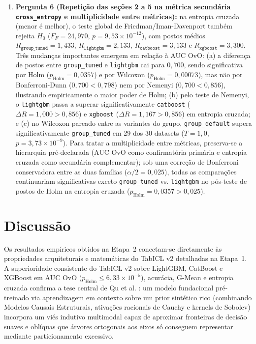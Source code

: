 \documentclass[11pt,a4paper]{article}
\begin{document}
\begin{enumerate}[leftmargin=2em]
    \item \textbf{Pergunta 6 (Repetição das seções 2 a 5 na métrica secundária \texttt{cross\_entropy} e multiplicidade entre métricas):} na entropia cruzada (menor é melhor), o teste global de Friedman/Iman-Davenport também rejeita $H_0$ ($F_F = 24{,}970$, $p = 9{,}53 \times 10^{-12}$), com postos médios $R_{\texttt{group\_tuned}} = 1{,}433$, $R_{\texttt{lightgbm}} = 2{,}133$, $R_{\texttt{catboost}} = 3{,}133$ e $R_{\texttt{xgboost}} = 3{,}300$. Três mudanças importantes emergem em relação à AUC OvO: (a) a diferença de postos entre \texttt{group\_tuned} e \texttt{lightgbm} cai para $0{,}700$, sendo significativa por Holm ($p_{\text{Holm}} = 0{,}0357$) e por Wilcoxon ($p_{\text{Holm}} = 0{,}00073$), mas não por Bonferroni-Dunn ($0{,}700 < 0{,}798$) nem por Nemenyi ($0{,}700 < 0{,}856$), ilustrando empiricamente o maior poder de Holm; (b) pelo teste de Nemenyi, o \texttt{lightgbm} passa a superar significativamente \texttt{catboost} ($\Delta R = 1{,}000 > 0{,}856$) e \texttt{xgboost} ($\Delta R = 1{,}167 > 0{,}856$) em entropia cruzada; e (c) no Wilcoxon pareado entre as variantes do grupo, \texttt{group\_default} supera significativamente \texttt{group\_tuned} em 29 dos 30 datasets ($T = 1{,}0$, $p = 3{,}73 \times 10^{-9}$). Para tratar a multiplicidade entre métricas, preserva-se a hierarquia pré-declarada (AUC OvO como confirmatória primária e entropia cruzada como secundária complementar); sob uma correção de Bonferroni conservadora entre as duas famílias ($\alpha/2 = 0{,}025$), todas as comparações continuariam significativas exceto \texttt{group\_tuned} vs. \texttt{lightgbm} no pós-teste de postos de Holm na entropia cruzada ($p_{\text{Holm}} = 0{,}0357 > 0{,}025$).
\end{enumerate}

\section{Discussão}
\label{sec:discussao}

Os resultados empíricos obtidos na Etapa~2 conectam-se diretamente às propriedades arquiteturais e matemáticas do TabICL v2 detalhadas na Etapa~1. A superioridade consistente do TabICL v2 sobre LightGBM, CatBoost e XGBoost em AUC OvO ($p_{\text{Holm}} \le 6{,}33 \times 10^{-5}$), acurácia, G-Mean e entropia cruzada confirma a tese central de Qu et al. \cite{qu2025tabicl,qu2026tabiclv2}: um modelo fundacional pré-treinado via aprendizagem em contexto sobre um prior sintético rico (combinando Modelos Causais Estruturais, ativações racionais de Cauchy e kernels de Sobolev) incorpora um viés indutivo multimodal capaz de aproximar fronteiras de decisão suaves e oblíquas que árvores ortogonais aos eixos só conseguem representar mediante particionamento excessivo.
\end{document}
